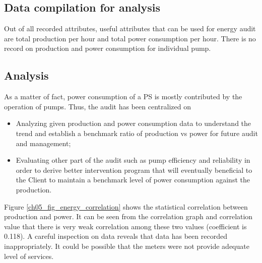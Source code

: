 \subsection{Data compilation for analysis}
Out of all recorded attributes, useful attributes that can be used for energy audit are total production per hour and total power consumption per hour. There is no record on production and power consumption for individual pump.


\subsection{Analysis}

As a matter of fact, power consumption of a PS is mostly contributed by the operation of pumps. Thus, the audit has been centralized on 
\begin{itemize}
	\item Analyzing given production and power consumption data to understand the trend and establish a benchmark ratio of production vs power for future audit and management;
	\item Evaluating other part of the audit such as pump efficiency and reliability in order to derive better intervention program that will eventually beneficial to the Client to maintain a benchmark level of power consumption against the production. 
\end{itemize}

Figure \ref{ch05_fig_energy_correlation} shows the statistical correlation between production and power. It can be seen from the correlation graph and correlation value that there is very weak correlation among these two values (coefficient is 0.118). A careful inspection on data reveals that data has been recorded inappropriately. It could be possible that the meters were not provide adequate level of services.



